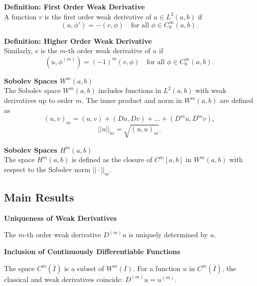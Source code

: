 \documentclass[../../main.tex]{subfiles}
\begin{document}
\textbf{Definition: First Order Weak Derivative}\\
A function \( v \) is the first order weak derivative of \( u \in L^2(a,b) \) if
\[ (u, \phi') = -(v, \phi) \quad \text{for all } \phi \in C^\infty_0(a,b). \]

\textbf{Definition: Higher Order Weak Derivative}\\
Similarly, \( v \) is the \( m \)-th order weak derivative of \( u \) if
\[ (u, \phi^{(m)}) = (-1)^m(v, \phi) \quad \text{for all } \phi \in C^\infty_0(a,b). \]

\textbf{Sobolev Spaces \( W^m(a,b) \)}\\
The Sobolev space \( W^m(a,b) \) includes functions in \( L^2(a,b) \) with weak derivatives up to order \( m \). The inner product and norm in \( W^m(a,b) \) are defined as
\[ (u,v)_m = (u,v) + (Du, Dv) + \dots + (D^m u, D^m v), \]
\[ ||u||_m = \sqrt{(u,u)_m}. \]

\textbf{Sobolev Spaces \( H^m(a,b) \)}\\
The space \( H^m(a,b) \) is defined as the closure of \( C^m[a,b] \) in \( W^m(a,b) \) with respect to the Sobolev norm \( ||\cdot||_m \).

\subsection*{Main Results}
\textbf{Uniqueness of Weak Derivatives}\\
\begin{thmAH1}
	The \( m \)-th order weak derivative \( D^{(m)}u \) is uniquely determined by \( u \).
\end{thmAH1}

\textbf{Inclusion of Continuously Differentiable Functions}\\
\begin{thmAH2}
	The space \( C^m(\overline{I}) \) is a subset of \( W^m(I) \). For a function \( u \) in \( C^m(\overline{I}) \), the classical and weak derivatives coincide: \( D^{(m)}u = u^{(m)} \).
\end{thmAH2}

\end{document}
